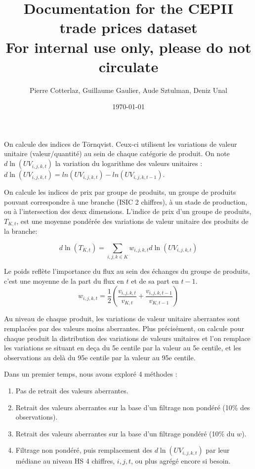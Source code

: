 \documentclass[12pt]{article}
\title{Documentation for the CEPII trade prices dataset \\
\small{For internal use only, please do not circulate}}
\author{Pierre Cotterlaz, Guillaume Gaulier, Aude Sztulman, Deniz Unal}
\date{\today}
\begin{document}
\maketitle

On calcule des indices de Törnqvist. Ceux-ci utilisent les variations de valeur unitaire (valeur/quantité) au sein de chaque catégorie de produit. On note $d\ln(UV_{i,j,k,t})$ la variation du logarithme des valeurs unitaires : $d\ln(UV_{i,j,k,t}) = ln(UV_{i,j,k,t}) - ln(UV_{i,j,k,t-1})$. 

On calcule les indices de prix par groupe de produits, un groupe de produits pouvant correspondre à une branche (ISIC 2 chiffres), à un stade de production, ou à l'intersection des deux dimensions. L'indice de prix d'un groupe de produits, $T_{K,t}$, est une moyenne pondérée des variations de valeur unitaire des produits de la branche: 

\begin{equation*}
    d\ln(T_{K,t}) = \sum_{i,j,k \in K} w_{i,j,k,t} d\ln(UV_{i,j,k,t})
\end{equation*}

Le poids reflète l'importance du flux au sein des échanges du groupe de produits, c'est une moyenne de la part du flux en $t$ et de sa part en $t-1$. 
$$w_{i,j,k,t} = \frac{1}{2} \left( \frac{v_{i,j,k,t}}{v_{K,t}} + \frac{v_{i,j,k,t-1}}{v_{K,t-1}}  \right)$$

Au niveau de chaque produit, les variations de valeur unitaire aberrantes sont remplacées par des valeurs moins aberrantes. Plus précisément, on calcule pour chaque produit la distribution des variations de valeurs unitaires et l'on remplace les variations se situant en deça du 5e centile par la valeur au 5e centile, et les observations au delà du 95e centile par la valeur au 95e centile.

Dans un premier temps, nous avons exploré 4 méthodes : 

\begin{enumerate}
\item Pas de retrait des valeurs aberrantes.
\item Retrait des valeurs aberrantes sur la base d'un filtrage non pondéré (10\% des observations).
\item Retrait des valeurs aberrantes sur la base d'un filtrage pondéré (10\% du $w$).
\item Filtrage non pondéré, puis remplacement des $d\ln(UV_{i,j,k,t})$ par leur médiane au niveau HS 4 chiffres, $i,j,t$, ou plus agrégé encore si besoin.  
\end{enumerate}
\end{document}
